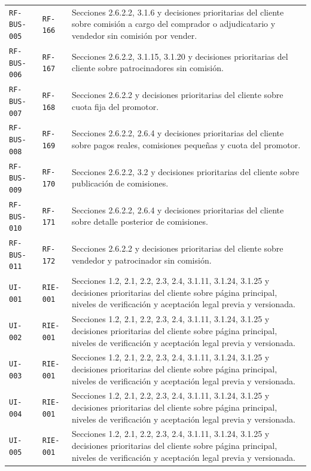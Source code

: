 \documentclass[10pt,letterpaper]{article}
\begin{document}
\begin{landscape}
\begin{longtable}{P{2.7cm}P{2.6cm}P{15.7cm}}
\texttt{RF-BUS-005} & \texttt{RF-166} & Secciones 2.6.2.2, 3.1.6 y decisiones prioritarias del cliente sobre comisión a cargo del comprador o adjudicatario y vendedor sin comisión por vender.\\
\texttt{RF-BUS-006} & \texttt{RF-167} & Secciones 2.6.2.2, 3.1.15, 3.1.20 y decisiones prioritarias del cliente sobre patrocinadores sin comisión.\\
\texttt{RF-BUS-007} & \texttt{RF-168} & Secciones 2.6.2.2 y decisiones prioritarias del cliente sobre cuota fija del promotor.\\
\texttt{RF-BUS-008} & \texttt{RF-169} & Secciones 2.6.2.2, 2.6.4 y decisiones prioritarias del cliente sobre pagos reales, comisiones pequeñas y cuota del promotor.\\
\texttt{RF-BUS-009} & \texttt{RF-170} & Secciones 2.6.2.2, 3.2 y decisiones prioritarias del cliente sobre publicación de comisiones.\\
\texttt{RF-BUS-010} & \texttt{RF-171} & Secciones 2.6.2.2, 2.6.4 y decisiones prioritarias del cliente sobre detalle posterior de comisiones.\\
\texttt{RF-BUS-011} & \texttt{RF-172} & Secciones 2.6.2.2 y decisiones prioritarias del cliente sobre vendedor y patrocinador sin comisión.\\
\texttt{UI-001} & \texttt{RIE-001} & Secciones 1.2, 2.1, 2.2, 2.3, 2.4, 3.1.11, 3.1.24, 3.1.25 y decisiones prioritarias del cliente sobre página principal, niveles de verificación y aceptación legal previa y versionada.\\
\texttt{UI-002} & \texttt{RIE-001} & Secciones 1.2, 2.1, 2.2, 2.3, 2.4, 3.1.11, 3.1.24, 3.1.25 y decisiones prioritarias del cliente sobre página principal, niveles de verificación y aceptación legal previa y versionada.\\
\texttt{UI-003} & \texttt{RIE-001} & Secciones 1.2, 2.1, 2.2, 2.3, 2.4, 3.1.11, 3.1.24, 3.1.25 y decisiones prioritarias del cliente sobre página principal, niveles de verificación y aceptación legal previa y versionada.\\
\texttt{UI-004} & \texttt{RIE-001} & Secciones 1.2, 2.1, 2.2, 2.3, 2.4, 3.1.11, 3.1.24, 3.1.25 y decisiones prioritarias del cliente sobre página principal, niveles de verificación y aceptación legal previa y versionada.\\
\texttt{UI-005} & \texttt{RIE-001} & Secciones 1.2, 2.1, 2.2, 2.3, 2.4, 3.1.11, 3.1.24, 3.1.25 y decisiones prioritarias del cliente sobre página principal, niveles de verificación y aceptación legal previa y versionada.\\

\end{longtable}
\end{landscape}
\end{document}
